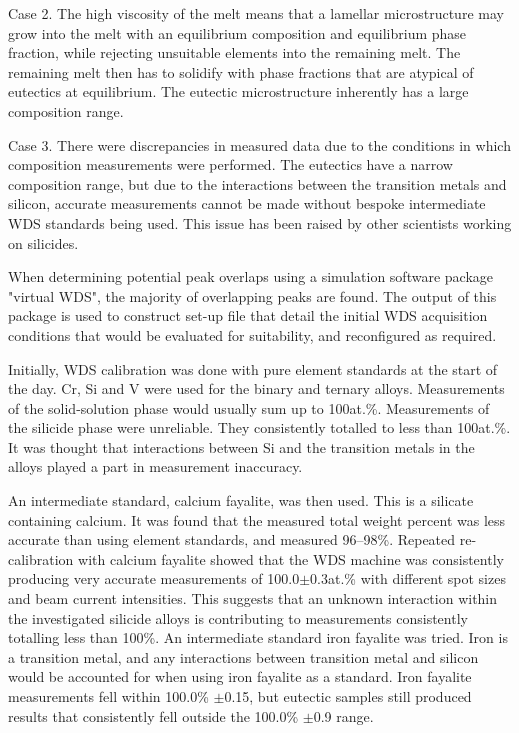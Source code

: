 Case 2.
The high viscosity of the melt means that a lamellar microstructure may grow into the melt with an equilibrium composition and equilibrium phase fraction, while rejecting unsuitable elements into the remaining melt.  The remaining melt then has to solidify with phase fractions that are atypical of eutectics at equilibrium.  The eutectic microstructure inherently has a large composition range.

Case 3. 
There were discrepancies in measured data due to the conditions in which composition measurements were performed.  The eutectics have a narrow composition range, but due to the interactions between the transition metals and silicon, accurate measurements cannot be made without bespoke intermediate WDS standards being used.  This issue has been raised by other scientists working on silicides. 

When determining potential peak overlaps using a simulation software package "virtual WDS",  the majority of overlapping peaks are found.  The output of this package is used to construct set-up file that detail the initial WDS acquisition conditions that would be evaluated for suitability, and reconfigured as required.  

Initially, WDS calibration was done with pure element standards at the start of the day.  Cr, Si and V were used for the binary and ternary alloys.  Measurements of the solid-solution phase would usually sum up to 100at.\%.  Measurements of the silicide phase were unreliable.  They consistently totalled to less than 100at.\%.  It was thought that interactions between Si and the transition metals in the alloys played a part in measurement inaccuracy. 
 
An intermediate standard, calcium fayalite, was then used.  This is a silicate containing calcium.  It was found that the measured total weight percent was less accurate than using element standards, and measured 96--98\%.  Repeated re-calibration with calcium fayalite showed that the WDS machine was consistently producing very accurate measurements of 100.0$\pm$0.3at.\% with different spot sizes and beam current intensities.  This suggests that an unknown interaction within the investigated silicide alloys is contributing to measurements consistently totalling less than 100\%.  An intermediate standard iron fayalite was tried.  Iron is a transition metal, and any interactions between transition metal and silicon would be accounted for when using iron fayalite as a standard.  Iron fayalite measurements fell within 100.0\% $\pm$0.15, but eutectic samples still produced results that consistently fell outside the 100.0\% $\pm$0.9 range.

